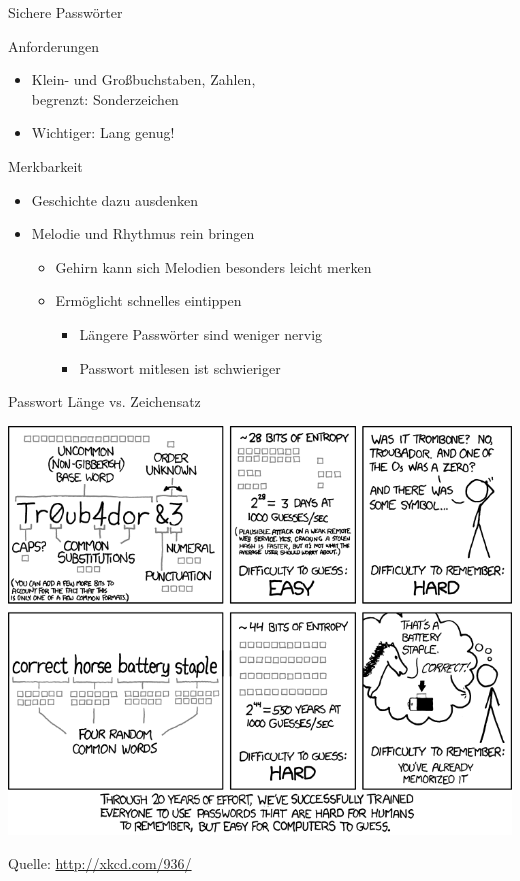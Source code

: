   \begin{frame}{Sichere Passwörter}
    \begin{block}{Anforderungen}
    \begin{itemize}
      \item Klein- und Großbuchstaben, Zahlen,\\ begrenzt: Sonderzeichen
      \item Wichtiger: Lang genug!
    \end{itemize}
    \end{block}
    \begin{block}{Merkbarkeit}
    \begin{itemize}
      \item Geschichte dazu ausdenken
      \item Melodie und Rhythmus rein bringen
      \begin{itemize}
        \item Gehirn kann sich Melodien besonders leicht merken
        \item Ermöglicht schnelles eintippen
        \begin{itemize}
          \item Längere Passwörter sind weniger nervig
          \item Passwort mitlesen ist schwieriger
        \end{itemize}
      \end{itemize}
    \end{itemize}
    \end{block}
  \end{frame}

  \begin{frame}{Passwort Länge vs. Zeichensatz}
    \begin{center}
      \includegraphics[width=0.99\textheight]{images/password_strength.png}\\
    \end{center}
    \tiny Quelle: \url{http://xkcd.com/936/}
  \end{frame}

